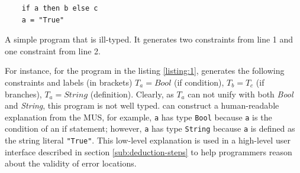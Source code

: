 \begin{listing}[!ht]
\begin{verbatim}
    if a then b else c
    a = "True"
\end{verbatim}
\vspace{-3mm}
\caption{A simple program that is ill-typed. It generates two constraints from line 1 and one constraint from line 2. }
\label{listing:1}
\end{listing}
For instance, for the program in the listing \ref{listing:1}, \chameleon{}  generates the following constraints and labels (in brackets) $T_a = Bool$ (if condition), $T_b = T_c$ (if branches), $T_a= String$  (definition). Clearly, as $T_a$ can not unify with both \textit{Bool} and \textit{String}, this program is not well typed. \chameleon{} can construct a human-readable explanation from the MUS, for example, \texttt{a} has type \texttt{Bool} because \texttt{a} is the condition of an if statement; however, \texttt{a} has type \texttt{String} because \texttt{a} is defined as the string literal \texttt{"True"}. This low-level explanation is used in a high-level user interface described in section \ref{sub:deduction-steps} to help programmers reason about the validity of error locations.






